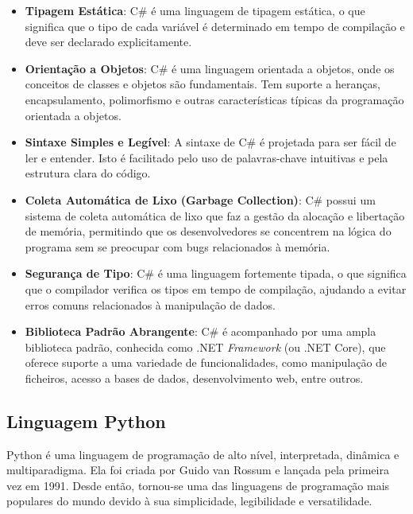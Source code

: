 \begin{itemize}
\item \textbf{Tipagem Estática}: C\# é uma linguagem de tipagem estática, o que 
significa que o tipo de cada variável é determinado em tempo de compilação e deve 
ser declarado explicitamente.

\item \textbf{Orientação a Objetos}: C\# é uma linguagem orientada a objetos, 
onde os conceitos de classes e objetos são fundamentais. Tem suporte a heranças, 
encapsulamento, polimorfismo e outras características típicas da programação 
orientada a objetos.

\item \textbf{Sintaxe Simples e Legível}: A sintaxe de C\# é projetada para 
ser fácil de ler e entender. Isto é facilitado pelo uso de palavras-chave intuitivas 
e pela estrutura clara do código.

\item \textbf{Coleta Automática de Lixo (Garbage Collection)}: C\# possui um sistema 
de coleta automática de lixo que faz a gestão da alocação e libertação de memória, 
permitindo que os desenvolvedores se concentrem na lógica do programa sem se preocupar
com bugs relacionados à memória.

\item \textbf{Segurança de Tipo}: C\# é uma linguagem fortemente tipada, o que 
significa que o compilador verifica os tipos em tempo de compilação, ajudando a evitar 
erros comuns relacionados à manipulação de dados.


\item \textbf{Biblioteca Padrão Abrangente}: C\# é acompanhado por uma ampla 
biblioteca padrão, conhecida como .NET \textit{Framework} (ou .NET Core), que oferece
suporte a uma variedade de funcionalidades, como manipulação de ficheiros, acesso a bases 
de dados, desenvolvimento web, entre outros.
\end{itemize}

\subsection{Linguagem Python}


Python é uma linguagem de programação de alto nível, interpretada, dinâmica e 
multiparadigma. Ela foi criada por Guido van Rossum e lançada pela primeira vez em 1991.
Desde então, tornou-se uma das linguagens de programação mais populares do mundo devido
à sua simplicidade, legibilidade e versatilidade.

